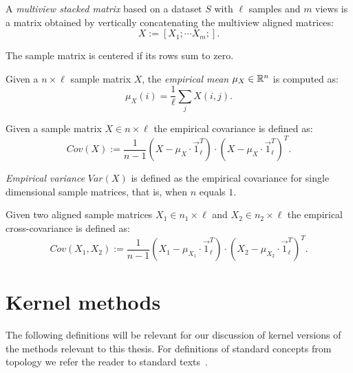 \begin{definition}\label{def:notation:multiview_stacked_matrix}
A \emph{multiview stacked matrix} based on a dataset $S$ with $\ell$ samples and $m$ views is a matrix obtained by 
vertically concatenating the multiview aligned matrices:
$$ X := \left[ X_1; \cdots X_m; \right].$$
\end{definition}

\begin{definition}\label{def:notation:centered_matrix}
The sample matrix is centered if its rows sum to zero.
\end{definition}

\begin{definition}\label{def:notation:empirical_mean}
Given a $n\times\ell$ sample matrix $X$, the \emph{empirical mean} $\mu_X \in \mathbb{R}^n$ is computed as:
$$ \mu_X(i) = \frac{1}{\ell} \sum_j X(i,j).$$
\end{definition}

\begin{definition}\label{def:notation:empirical_covariance}
Given a sample matrix $X \in n \times \ell$
 the empirical covariance is defined as:
$$ Cov(X) := \frac{1}{n-1}(X - \mu_{X} \cdot \vec{1}_\ell^T)\cdot(X - \mu_{X} \cdot \vec{1}_\ell^T)^T.$$
\end{definition}

\begin{definition}\label{def:notation:empirical_variance}
\emph{Empirical variance} $Var(X)$ is defined as the empirical covariance for single dimensional sample matrices, that is, when $n$ equals $1$.
\end{definition}

\begin{definition}\label{def:notation:empirical_cross_covariance}
Given two aligned sample matrices $X_1 \in n_1 \times \ell$ and $X_2 \in n_2 \times \ell$ 
 the empirical cross-covariance is defined as:
$$ Cov(X_1, X_2) := \frac{1}{n-1}(X_1 - \mu_{X_1} \cdot \vec{1}_\ell^T)\cdot(X_2 - \mu_{X_2} \cdot \vec{1}_\ell^T)^T.$$
\end{definition}


\section{Kernel methods}
The following definitions will be relevant for our discussion of kernel versions of the methods relevant to this thesis. For definitions
of standard concepts from topology we refer the reader to standard texts~\cite{bourbaki1998general}.

